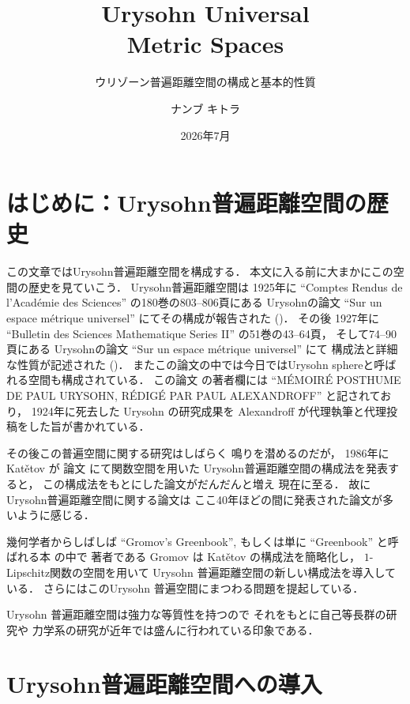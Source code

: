 \documentclass[leqno, 12pt]{jsarticle}
\title{Urysohn Universal \\ Metric Spaces}
\author{ナンブ キトラ}
\date{2026年7月}
\subtitle{ウリゾーン普遍距離空間の構成と基本的性質}
\makeatletter
\newenvironment{booktitlepage}{%
  \begin{titlepage}%
    \thispagestyle{empty}%
    \centering
    \vspace*{0.22\textheight}
    {\Huge\bfseries \@title\par}
    \vspace{1.5em}
    {\Large \@subtitle\par}
    \vfill
    {\large \@author\par}
    \vspace{1em}
    {\large \@date\par}
    \vspace*{0.12\textheight}
}{%
  \end{titlepage}%
}
\makeatother
\begin{document}
\hypersetup{pageanchor=false}
\begin{booktitlepage}
\end{booktitlepage}
\hypersetup{pageanchor=true}

\section*{はじめに：Urysohn普遍距離空間の歴史}\label{sec:history}

この文章ではUrysohn普遍距離空間を構成する．
本文に入る前に大まかにこの空間の歴史を見ていこう．
Urysohn普遍距離空間は
1925年に
``Comptes Rendus de l'Acad\'{e}mie des Sciences''
の180巻の803--806頁にある
Urysohnの論文
``Sur un espace m\'etrique universel''
にてその構成が報告された (\cite{Ury1})．
その後
1927年に
``Bulletin des Sciences Mathematique Series II''
の51巻の43--64頁，%
そして74--90頁にある
Urysohnの論文
``Sur un espace m\'etrique universel''
にて
構成法と詳細な性質が記述された
(\cite{Ury2})．
またこの論文の中では今日ではUrysohn sphereと呼ばれる空間も構成されている．
この論文
\cite{Ury2}
の著者欄には
``M\'{E}MOIR\'{E} POSTHUME DE PAUL URYSOHN,
R\'{E}DIG\'{E} PAR PAUL ALEXANDROFF''
と記されており，
1924年に死去した
Urysohn
の研究成果を
Alexandroff
が代理執筆と代理投稿をした旨が書かれている．



その後この普遍空間に関する研究はしばらく
鳴りを潜めるのだが，
1986年に
Kat\v{e}tov
が
論文
\cite{Ka}
にて関数空間を用いた
Urysohn普遍距離空間の構成法を発表すると，
この構成法をもとにした論文がだんだんと増え
現在に至る．
故にUrysohn普遍距離空間に関する論文は
ここ40年ほどの間に発表された論文が多いように感じる．

幾何学者からしばしば
``Gromov's Greenbook'',
もしくは単に
``Greenbook''
と呼ばれる本
\cite{Greenbook}
の中で
著者である
Gromov
は
Kat\v{e}tov
の構成法を簡略化し，
$1$-Lipschitz関数の空間を用いて
Urysohn
普遍距離空間の新しい構成法を導入している．
さらにはこのUrysohn
普遍空間にまつわる問題を提起している．



Urysohn
普遍距離空間は強力な等質性を持つので
それをもとに自己等長群の研究や
力学系の研究が近年では盛んに行われている印象である．


\newpage
\tableofcontents




\newpage
\section{Urysohn普遍距離空間への導入}\label{sec:intro1}
\end{document}
